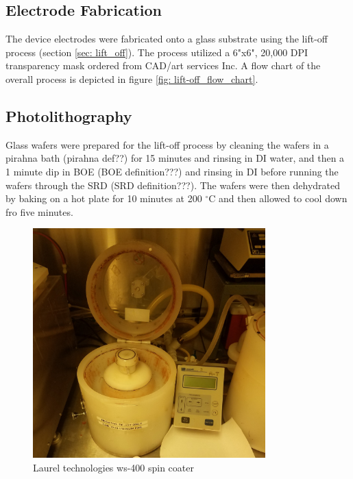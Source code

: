 \subsection{Electrode Fabrication}

\par The device electrodes were fabricated onto a glass substrate using the lift-off process (section \ref{sec: lift_off}). The process utilized a 6"x6", 20,000 DPI transparency mask ordered from CAD/art services Inc. A flow chart of the overall process is depicted in figure \ref{fig: lift-off_flow_chart}.

\subsection*{Photolithography}

\par Glass wafers were prepared for the lift-off process by cleaning the wafers in a pirahna bath (pirahna def??) for 15 minutes and rinsing in DI water, and then a 1 minute dip in BOE (BOE definition???) and rinsing in DI before running the wafers through the SRD (SRD definition???). The wafers were then dehydrated by baking on a hot plate for 10 minutes at 200 $^\circ$C and then allowed to cool down fro five minutes. 

\begin{figure}[h]
    \centering
    \includegraphics[width=0.8\textwidth]{images/resist_spinner_open.jpg}
    \caption{Laurel technologies ws-400 spin coater}
    \label{fig:spin_coater}
\end{figure}


